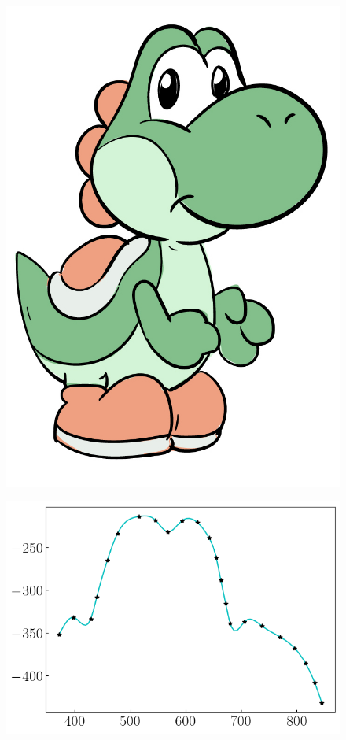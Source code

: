 \documentclass[12pt,a4paper]{article}
\begin{document}
\begin{figure}[H]
    \begin{center}
        \includegraphics[scale=0.3]{./yoshi.jpg} 
    \end{center}
\end{figure}

\begin{figure}[H]
    \begin{center}
        \includegraphics[scale=0.75]{./fig4.png} 
    \end{center}
\end{figure}

\end{document}
